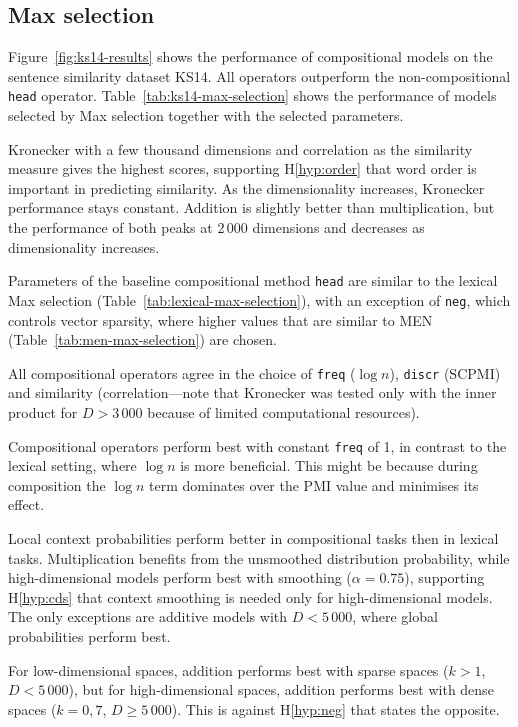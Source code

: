 \subsection{Max selection}
\label{sec:max-selection-ks14}

Figure~\ref{fig:ks14-results} shows the performance of compositional models on the sentence similarity dataset KS14. All operators outperform the non-compositional \texttt{head} operator. Table~\ref{tab:ks14-max-selection} shows the performance of models selected by Max selection together with the selected parameters.

Kronecker with a few thousand dimensions and correlation as the similarity measure gives the highest scores, supporting H\ref{hyp:order} that word order is important in predicting similarity. As the dimensionality increases, Kronecker performance stays constant. Addition is slightly better than multiplication, but the performance of both peaks at 2\,000 dimensions and decreases as dimensionality increases.



Parameters of the baseline compositional method \texttt{head} are similar to the lexical Max selection (Table~\ref{tab:lexical-max-selection}), with an exception of \texttt{neg}, which controls vector sparsity, where higher values that are similar to MEN (Table~\ref{tab:men-max-selection}) are chosen.

All compositional operators agree in the choice of \texttt{freq} ($\log n$), \texttt{discr} (SCPMI) and similarity (correlation---note that Kronecker was tested only with the inner product for $D > 3\,000$ because of limited computational resources).

Compositional operators perform best with constant \texttt{freq} of 1, in contrast to the lexical setting, where $\log n$ is more beneficial. This might be because during composition the $\log n$ term dominates over the PMI value and minimises its effect.

Local context probabilities perform better in compositional tasks then in lexical tasks. Multiplication benefits from the unsmoothed distribution probability, while high-dimensional models perform best with smoothing ($\alpha = 0.75$), supporting H\ref{hyp:cds} that context smoothing is needed only for high-dimensional models. The only exceptions are additive models with $D < 5\,000$, where global probabilities perform best.

For low-dimensional spaces, addition performs best with sparse spaces ($k > 1$, $D < 5\,000$), but for high-dimensional spaces, addition performs best  with dense spaces ($k = 0,7$, $D \geq 5\,000$). This is against H\ref{hyp:neg} that states the opposite.


